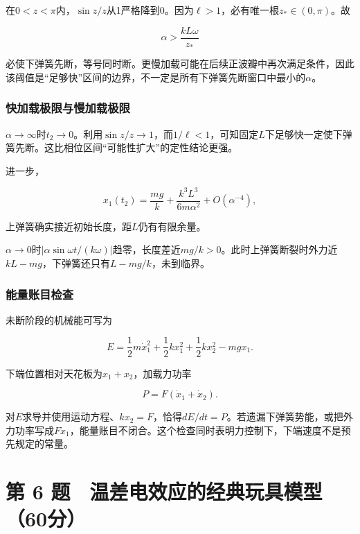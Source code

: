 \documentclass[12pt,a4paper,fontset=fandol]{ctexart}
\begin{document}
在\(0<z<\pi\)内，\(\sin z/z\)从1严格降到0。因为\(\ell>1\)，必有唯一根\(z_*\in(0,\pi)\)。故

\[
\alpha>\frac{kL\omega}{z_*}
\]

必使下弹簧先断，等号同时断。更慢加载可能在后续正波瓣中再次满足条件，因此该阈值是``足够快''区间的边界，不一定是所有下弹簧先断窗口中最小的\(\alpha\)。

\subsubsection{快加载极限与慢加载极限}\label{ux5febux52a0ux8f7dux6781ux9650ux4e0eux6162ux52a0ux8f7dux6781ux9650}

\(\alpha\to\infty\)时\(t_2\to0\)。利用\(\sin z/z\to1\)，而\(1/\ell<1\)，可知固定\(L\)下足够快一定使下弹簧先断。这比相位区间``可能性扩大''的定性结论更强。

进一步，

\[
x_1(t_2)=\frac{mg}k+\frac{k^3L^3}{6m\alpha^2}
+O(\alpha^{-4}),
\]

上弹簧确实接近初始长度，距\(L\)仍有有限余量。

\(\alpha\to0\)时\(|\alpha\sin\omega t/(k\omega)|\)趋零，长度差近\(mg/k>0\)。此时上弹簧断裂时外力近\(kL-mg\)，下弹簧还只有\(L-mg/k\)，未到临界。

\par\noindent\begin{minipage}{\linewidth}
\subsubsection{能量账目检查}\label{ux80fdux91cfux8d26ux76eeux68c0ux67e5}

未断阶段的机械能可写为

\[
E=\frac12m\dot x_1^2
+\frac12kx_1^2+\frac12kx_2^2-mgx_1.
\]

下端位置相对天花板为\(x_1+x_2\)，加载力功率

\[
P=F(\dot x_1+\dot x_2).
\]

对\(E\)求导并使用运动方程、\(kx_2=F\)，恰得\(dE/dt=P\)。若遗漏下弹簧势能，或把外力功率写成\(F\dot x_1\)，能量账目不闭合。这个检查同时表明力控制下，下端速度不是预先规定的常量。

\end{minipage}\par
\clearpage

\section{第 6
题　温差电效应的经典玩具模型（60分）}\label{ux7b2c-6-ux9898-ux6e29ux5deeux7535ux6548ux5e94ux7684ux7ecfux5178ux73a9ux5177ux6a21ux578b60ux5206}
\end{document}
